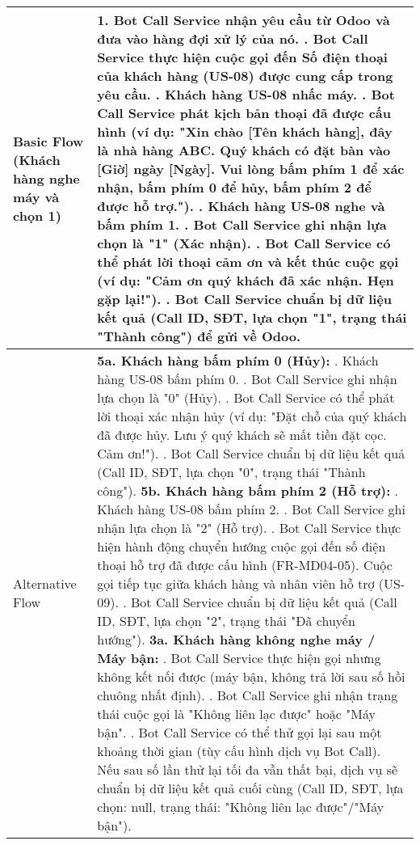 \begin{longtable}{|m{4cm}|p{11cm}|}
Basic Flow (Khách hàng nghe máy và chọn 1) & 1. Bot Call Service nhận yêu cầu từ Odoo và đưa vào hàng đợi xử lý của nó. \newline 2. Bot Call Service thực hiện cuộc gọi đến Số điện thoại của khách hàng (US-08) được cung cấp trong yêu cầu. \newline 3. Khách hàng US-08 nhấc máy. \newline 4. Bot Call Service phát kịch bản thoại đã được cấu hình (ví dụ: "Xin chào [Tên khách hàng], đây là nhà hàng ABC. Quý khách có đặt bàn vào [Giờ] ngày [Ngày]. Vui lòng bấm phím 1 để xác nhận, bấm phím 0 để hủy, bấm phím 2 để được hỗ trợ."). \newline 5. Khách hàng US-08 nghe và bấm phím 1. \newline 6. Bot Call Service ghi nhận lựa chọn là "1" (Xác nhận). \newline 7. Bot Call Service có thể phát lời thoại cảm ơn và kết thúc cuộc gọi (ví dụ: "Cảm ơn quý khách đã xác nhận. Hẹn gặp lại!"). \newline 8. Bot Call Service chuẩn bị dữ liệu kết quả (Call ID, SĐT, lựa chọn "1", trạng thái "Thành công") để gửi về Odoo. \\
\hline
Alternative Flow & \textbf{5a. Khách hàng bấm phím 0 (Hủy):} \newline    1. Khách hàng US-08 bấm phím 0. \newline    2. Bot Call Service ghi nhận lựa chọn là "0" (Hủy). \newline    3. Bot Call Service có thể phát lời thoại xác nhận hủy (ví dụ: "Đặt chỗ của quý khách đã được hủy. Lưu ý quý khách sẽ mất tiền đặt cọc. Cảm ơn!"). \newline    4. Bot Call Service chuẩn bị dữ liệu kết quả (Call ID, SĐT, lựa chọn "0", trạng thái "Thành công"). \newline \textbf{5b. Khách hàng bấm phím 2 (Hỗ trợ):} \newline    1. Khách hàng US-08 bấm phím 2. \newline    2. Bot Call Service ghi nhận lựa chọn là "2" (Hỗ trợ). \newline    3. Bot Call Service thực hiện hành động chuyển hướng cuộc gọi đến số điện thoại hỗ trợ đã được cấu hình (FR-MD04-05). Cuộc gọi tiếp tục giữa khách hàng và nhân viên hỗ trợ (US-09). \newline    4. Bot Call Service chuẩn bị dữ liệu kết quả (Call ID, SĐT, lựa chọn "2", trạng thái "Đã chuyển hướng"). \newline \textbf{3a. Khách hàng không nghe máy / Máy bận:} \newline    1. Bot Call Service thực hiện gọi nhưng không kết nối được (máy bận, không trả lời sau số hồi chuông nhất định). \newline    2. Bot Call Service ghi nhận trạng thái cuộc gọi là "Không liên lạc được" hoặc "Máy bận". \newline    3. Bot Call Service có thể thử gọi lại sau một khoảng thời gian (tùy cấu hình dịch vụ Bot Call). Nếu sau số lần thử lại tối đa vẫn thất bại, dịch vụ sẽ chuẩn bị dữ liệu kết quả cuối cùng (Call ID, SĐT, lựa chọn: null, trạng thái: "Không liên lạc được"/"Máy bận"). \\

\end{longtable}
